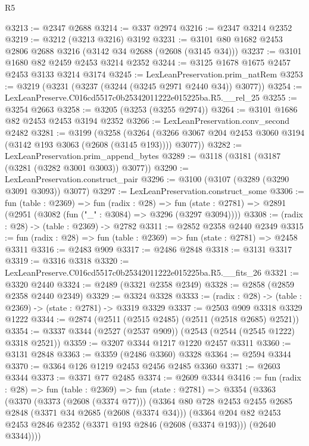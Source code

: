 \begin{lexlean}{R5}
\begin{coremodule}
@3213 := @2347 @2688
@3214 := @337 @2974
@3216 := @2347 @3214 @2352
@3219 := @3212 (@3213 @3216) @3192
@3231 := @3101 @80 @1682 @2453 @2806 @2688 @3216 (@3142 @34 @2688 (@2608 (@3145 @34)))
@3237 := @3101 @1680 @82 @2459 @2453 @3214 @2352
@3244 := @3125 @1678 @1675 @2457 @2453 @3133 @3214 @3174
@3245 := LexLeanPreservation.prim_natRem
@3253 := @3219 (@3231 (@3237 (@3244 (@3245 @2971 @2440 @34)) @3077))
@3254 := LexLeanPreserve.C016cd5517c0b25342011222e015225ba.R5.__rel_25
@3255 := @3254 @2663
@3258 := @3205 (@3253 (@3255 @2974))
@3264 := @3101 @1686 @82 @2453 @2453 @3194 @2352
@3266 := LexLeanPreservation.conv_second @2482
@3281 := @3199
    (@3258
      (@3264 (@3266 @3067 @204 @2453 @3060 @3194 (@3142 @193 @3063 (@2608 (@3145 @193)))) @3077))
@3282 := LexLeanPreservation.prim_append_bytes
@3289 := @3118 (@3181 (@3187 (@3281 (@3282 @3001 @3003)) @3077))
@3290 := LexLeanPreservation.construct_pair
@3296 := @3100 (@3107 (@3289 (@3290 @3091 @3093)) @3077)
@3297 := LexLeanPreservation.construct_some
@3306 := fun (table : @2369) =>
  fun (radix : @28) =>
  fun (state : @2781) => @2891 (@2951 (@3082 (fun ("_" : @3084) => @3296 (@3297 @3094))))
@3308 := (radix : @28) -> (table : @2369) -> @2782
@3311 := @2852 @2358 @2440 @2349
@3315 := fun (radix : @28) => fun (table : @2369) => fun (state : @2781) => @2458 @3311
@3316 := @2483 @909
@3317 := @2486 @2848
@3318 := @3131 @3317
@3319 := @3316 @3318
@3320 := LexLeanPreserve.C016cd5517c0b25342011222e015225ba.R5.__fits_26
@3321 := @3320 @2440
@3324 := @2489 (@3321 @2358 @2349)
@3328 := @2858 (@2859 @2358 @2440 @2349)
@3329 := @3324 @3328
@3333 := (radix : @28) -> (table : @2369) -> (state : @2781) -> @3319 @3329
@3337 := @2503 @909 @3318 @3329 @1222
@3344 := @2874 (@2511 (@2515 @2485) (@2511 (@2518 @2685) @2521))
@3354 := @3337 @3344 (@2527 (@2537 @909)) (@2543 (@2544 (@2545 @1222) @3318 @2521))
@3359 := @3207 @3344 @1217 @1220 @2457 @3311
@3360 := @3131 @2848
@3363 := @3359 (@2486 @3360) @3328
@3364 := @2594 @3344
@3370 := @3364 @126 @1219 @2453 @2456 @2485 @3360
@3371 := @2603 @3344
@3373 := @3371 @77 @2485
@3374 := @2609 @3344
@3416 := fun (radix : @28) =>
  fun (table : @2369) =>
  fun (state : @2781) =>
  @3354
    (@3363
      (@3370
        (@3373 (@2608 (@3374 @77)))
        (@3364
          @80
          @728
          @2453
          @2455
          @2685
          @2848
          (@3371 @34 @2685 (@2608 (@3374 @34)))
          (@3364
            @204
            @82
            @2453
            @2453
            @2846
            @2352
            (@3371 @193 @2846 (@2608 (@3374 @193)))
            (@2640 @3344))))

\end{coremodule}
\end{lexlean}

